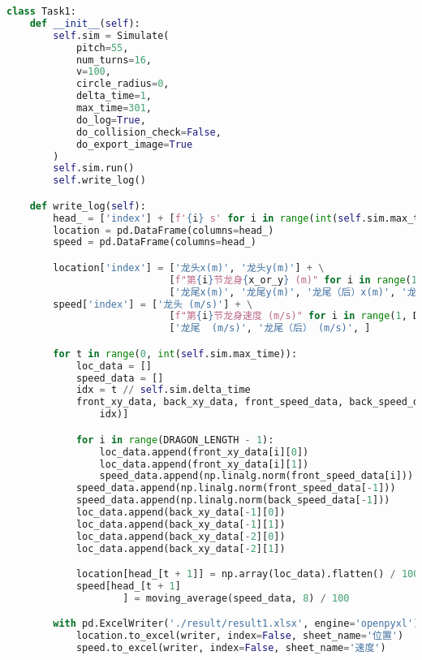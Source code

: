 \begin{lstlisting}[language=python]
class Task1:
    def __init__(self):
        self.sim = Simulate(
            pitch=55,
            num_turns=16,
            v=100,
            circle_radius=0,
            delta_time=1,
            max_time=301,
            do_log=True,
            do_collision_check=False,
            do_export_image=True
        )
        self.sim.run()
        self.write_log()

    def write_log(self):
        head_ = ['index'] + [f'{i} s' for i in range(int(self.sim.max_time))]
        location = pd.DataFrame(columns=head_)
        speed = pd.DataFrame(columns=head_)

        location['index'] = ['龙头x(m)', '龙头y(m)'] + \
                            [f"第{i}节龙身{x_or_y} (m)" for i in range(1, DRAGON_LENGTH - 1) for x_or_y in ['x', 'y']] + \
                            ['龙尾x(m)', '龙尾y(m)', '龙尾（后）x(m)', '龙尾（后）y(m)', ]
        speed['index'] = ['龙头 (m/s)'] + \
                            [f"第{i}节龙身速度 (m/s)" for i in range(1, DRAGON_LENGTH - 1)] + \
                            ['龙尾  (m/s)', '龙尾（后） (m/s)', ]

        for t in range(0, int(self.sim.max_time)):
            loc_data = []
            speed_data = []
            idx = t // self.sim.delta_time
            front_xy_data, back_xy_data, front_speed_data, back_speed_data = self.sim.log[int(
                idx)]

            for i in range(DRAGON_LENGTH - 1):
                loc_data.append(front_xy_data[i][0])
                loc_data.append(front_xy_data[i][1])
                speed_data.append(np.linalg.norm(front_speed_data[i]))
            speed_data.append(np.linalg.norm(front_speed_data[-1]))
            speed_data.append(np.linalg.norm(back_speed_data[-1]))
            loc_data.append(back_xy_data[-1][0])
            loc_data.append(back_xy_data[-1][1])
            loc_data.append(back_xy_data[-2][0])
            loc_data.append(back_xy_data[-2][1])

            location[head_[t + 1]] = np.array(loc_data).flatten() / 100
            speed[head_[t + 1]
                    ] = moving_average(speed_data, 8) / 100

        with pd.ExcelWriter('./result/result1.xlsx', engine='openpyxl') as writer:
            location.to_excel(writer, index=False, sheet_name='位置')
            speed.to_excel(writer, index=False, sheet_name='速度')
\end{lstlisting}

